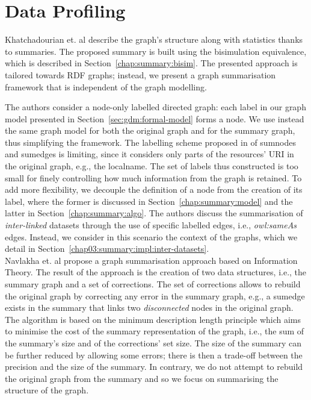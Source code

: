 
\section{Data Profiling}
\label{chap03:review:query-profiling}

Khatchadourian et. al \cite{khatchadourian:2010:eswc} describe the graph's structure along with statistics thanks to summaries. The proposed summary is built using the bisimulation equivalence, which is described in Section~\ref{chap:summary:bisim}. The presented approach is tailored towards RDF graphs; instead, we present a graph summarisation framework that is independent of the graph modelling.

The authors consider a node-only labelled directed graph: each label in our graph model presented in Section~\ref{sec:gdm:formal-model} forms a node. We use instead the same graph model for both the original graph and for the summary graph, thus simplifying the framework.
The labelling scheme proposed in \cite{khatchadourian:2010:eswc} of sumnodes and sumedges is limiting, since it considers only parts of the resources' URI in the original graph, e.g., the localname. The set of labels thus constructed is too small for finely controlling how much information from the graph is retained. To add more flexibility, we decouple the definition of a node from the creation of its label, where the former is discussed in Section~\ref{chap:summary:model} and the latter in Section~\ref{chap:summary:algo}.
The authors discuss the summarisation of \emph{inter-linked} datasets through the use of specific labelled edges, i.e., \emph{owl:sameAs} edges. Instead, we consider in this scenario the context of the graphs, which we detail in Section~\ref{chap03:summary:impl:inter-datasets}.\\

Navlakha et. al \cite{navlakha:2008:gsb} propose a graph summarisation approach based on Information Theory. The result of the approach is the creation of two data structures, i.e., the summary graph and a set of corrections. The set of corrections allows to rebuild the original graph by correcting any error in the summary graph, e.g., a sumedge exists in the summary that links two \emph{disconnected} nodes in the original graph. The algorithm is based on the minimum description length \cite{grunwald:2007:mdl} principle which aims to minimise the cost of the summary representation of the graph, i.e., the sum of the summary's size and of the corrections' set size.
The size of the summary can be further reduced by allowing some errors; there is then a trade-off between the precision and the size of the summary. In contrary, we do not attempt to rebuild the original graph from the summary and so we focus on summarising the structure of the graph.

